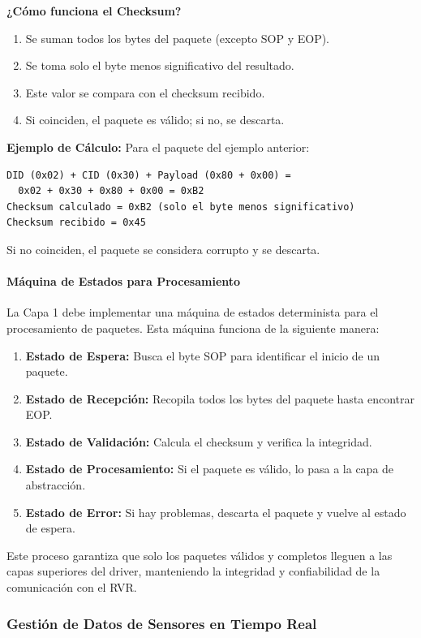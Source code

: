 \documentclass[11pt]{article}
\numberwithin{figure}{section}
\numberwithin{table}{section}
\begin{document}
\textbf{¿Cómo funciona el Checksum?}
\begin{enumerate}
    \item Se suman todos los bytes del paquete (excepto SOP y EOP).
    \item Se toma solo el byte menos significativo del resultado.
    \item Este valor se compara con el checksum recibido.
    \item Si coinciden, el paquete es válido; si no, se descarta.
\end{enumerate}

\textbf{Ejemplo de Cálculo:}
Para el paquete del ejemplo anterior:
\begin{verbatim}
DID (0x02) + CID (0x30) + Payload (0x80 + 0x00) =
  0x02 + 0x30 + 0x80 + 0x00 = 0xB2
Checksum calculado = 0xB2 (solo el byte menos significativo)
Checksum recibido = 0x45
\end{verbatim}
Si no coinciden, el paquete se considera corrupto y se descarta.

\paragraph{Máquina de Estados para Procesamiento}
La Capa 1 debe implementar una máquina de estados determinista para el procesamiento de paquetes. Esta máquina funciona de la siguiente manera:

\begin{enumerate}
    \item \textbf{Estado de Espera:} Busca el byte SOP para identificar el inicio de un paquete.
    \item \textbf{Estado de Recepción:} Recopila todos los bytes del paquete hasta encontrar EOP.
    \item \textbf{Estado de Validación:} Calcula el checksum y verifica la integridad.
    \item \textbf{Estado de Procesamiento:} Si el paquete es válido, lo pasa a la capa de abstracción.
    \item \textbf{Estado de Error:} Si hay problemas, descarta el paquete y vuelve al estado de espera.
\end{enumerate}

Este proceso garantiza que solo los paquetes válidos y completos lleguen a las capas superiores del driver, manteniendo la integridad y confiabilidad de la comunicación con el RVR.


\subsubsection{Gestión de Datos de Sensores en Tiempo Real}
\end{document}

